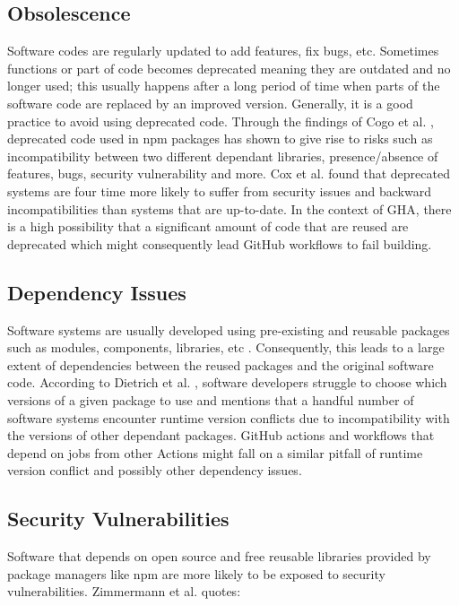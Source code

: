 \documentclass[conference]{IEEEtran}
\begin{document}
\subsection{Obsolescence}

Software codes are regularly updated to add features, fix bugs, etc. Sometimes functions or part of code becomes deprecated meaning they are outdated and no longer used; this usually happens after a long period of time when parts of the software code are replaced by an improved version. Generally, it is a good practice to avoid using deprecated code. Through the findings of Cogo et al. \cite{cogo2021deprecation}, deprecated code used in npm packages has shown to give rise to risks such as incompatibility between two different dependant libraries, presence/absence of features, bugs, security vulnerability and more. Cox et al. \cite{cox2015measuring} found that deprecated systems are four time more likely to suffer from security issues and backward incompatibilities than systems that are up-to-date. In the context of GHA, there is a high possibility that a significant amount of code that are reused are deprecated which might consequently lead GitHub workflows to fail building.
\subsection{Dependency Issues}
Software systems are usually developed using pre-existing and reusable packages such as modules, components, libraries, etc \cite{decan2019empirical}\cite{soto2021comprehensive}. Consequently, this leads to a large extent of dependencies between the reused packages and the original software code. According to Dietrich et al. \cite{dietrich2019dependency}, software developers struggle to choose which versions of a given package to use and mentions that a handful number of software systems encounter runtime version conflicts due to incompatibility with the versions of other dependant packages. GitHub actions and workflows that depend on jobs from other Actions might fall on a similar pitfall of runtime version conflict and possibly other dependency issues.
\subsection{Security Vulnerabilities}
Software that depends on open source and free reusable libraries provided by package managers like npm are more likely to be exposed to security vulnerabilities. Zimmermann et al. \cite{zimmermann2019small} quotes: \\
\end{document}
